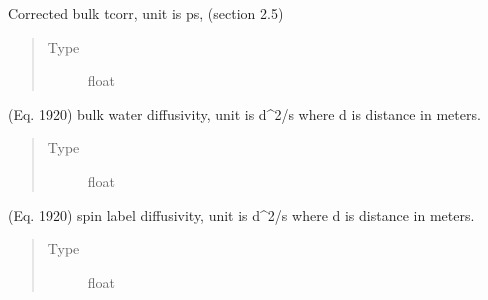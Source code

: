 \documentclass[letterpaper,10pt,english]{sphinxmanual}
\begin{document}
\begin{fulllineitems}
\begin{fulllineitems}
\label{\detokenize{dnpHydration:dnpLab.dnpHydration.HydrationParameter.tcorr_bulk}}
Corrected bulk tcorr, unit is ps, (section 2.5)
\begin{quote}\begin{description}
\item[{Type}] \leavevmode
float

\end{description}\end{quote}

\end{fulllineitems}


\begin{fulllineitems}
\label{\detokenize{dnpHydration:dnpLab.dnpHydration.HydrationParameter.D_H2O}}
(Eq. 19\sphinxhyphen{}20) bulk water diffusivity, unit is d\textasciicircum{}2/s where d is
distance in meters.
\begin{quote}\begin{description}
\item[{Type}] \leavevmode
float

\end{description}\end{quote}

\end{fulllineitems}


\begin{fulllineitems}
\label{\detokenize{dnpHydration:dnpLab.dnpHydration.HydrationParameter.D_SL}}
(Eq. 19\sphinxhyphen{}20) spin label diffusivity, unit is d\textasciicircum{}2/s where d is
distance in meters.
\begin{quote}\begin{description}
\item[{Type}] \leavevmode
float

\end{description}\end{quote}


\end{fulllineitems}
\end{fulllineitems}
\end{document}
